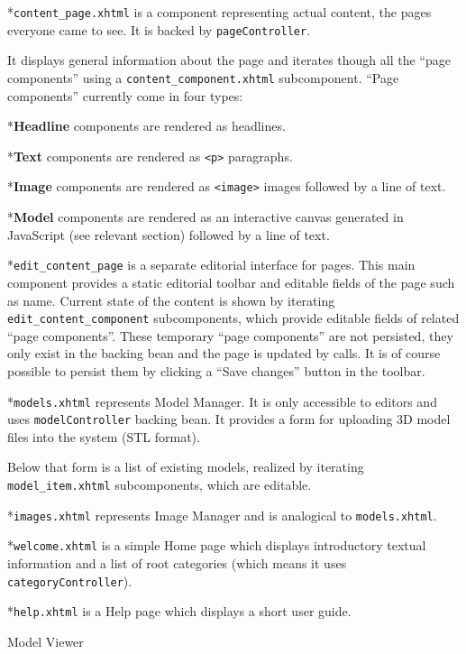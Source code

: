 *{\tt content\_page.xhtml} is a component representing actual content, the pages everyone came to see. It is backed by {\tt pageController}.

It displays general information about the page and iterates though all the “page components” using a {\tt content\_component.xhtml} subcomponent. “Page components” currently come in four types:

\begitems

*{\bf Headline} components are rendered as {\tt <h3>} headlines.

*{\bf Text} components are rendered as {\tt <p>} paragraphs.

*{\bf Image} components are rendered as {\tt <image>} images followed by a line of text.

*{\bf Model} components are rendered as an interactive canvas generated in JavaScript (see relevant section) followed by a line of text.

\enditems

*{\tt edit\_content\_page} is a separate editorial interface for pages. This main component provides a static editorial toolbar and editable fields of the page such as name. Current state of the content is shown by iterating {\tt edit\_content\_component} subcomponents, which provide editable fields of related “page components”. These temporary “page components” are not persisted, they only exist in the backing bean and the page is updated by  calls. It is of course possible to persist them by clicking a “Save changes” button in the toolbar.

*{\tt models.xhtml} represents Model Manager. It is only accessible to editors and uses {\tt modelController} backing bean.
It provides a form for uploading 3D model files into the system (STL format).

Below that form is a list of existing models, realized by iterating {\tt model\_item.xhtml} subcomponents, which are editable.

*{\tt images.xhtml} represents Image Manager and is analogical to {\tt models.xhtml}.

*{\tt welcome.xhtml} is a simple Home page which displays introductory textual information and a list of root categories (which means it uses {\tt categoryController}).

*{\tt help.xhtml} is a Help page which displays a short user guide.

\enditems

\sec Model Viewer

